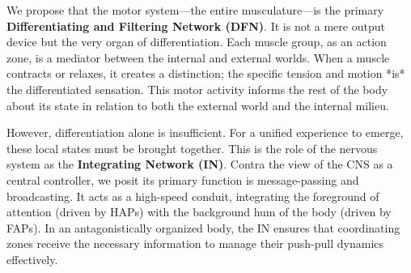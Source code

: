 We propose that the motor system—the entire musculature—is the primary \textbf{Differentiating and Filtering Network (DFN)}. It is not a mere output device but the very organ of differentiation. Each muscle group, as an action zone, is a mediator between the internal and external worlds. When a muscle contracts or relaxes, it creates a distinction; the specific tension and motion *is* the differentiated sensation. This motor activity informs the rest of the body about its state in relation to both the external world and the internal milieu.

However, differentiation alone is insufficient. For a unified experience to emerge, these local states must be brought together. This is the role of the nervous system as the \textbf{Integrating Network (IN)}. Contra the view of the CNS as a central controller, we posit its primary function is message-passing and broadcasting. It acts as a high-speed conduit, integrating the foreground of attention (driven by HAPs) with the background hum of the body (driven by FAPs). In an antagonistically organized body, the IN ensures that coordinating zones receive the necessary information to manage their push-pull dynamics effectively.

